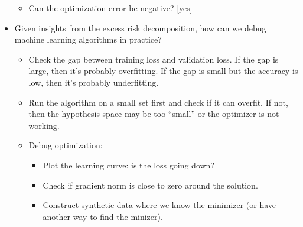 \documentclass[11pt]{article}
\begin{document}
\begin{itemize}
\begin{itemize}
\item Can the optimization error be negative? [yes]
\end{itemize}

\item Given insights from the excess risk decomposition, how can we debug machine learning algorithms in practice?
\begin{itemize}
\item Check the gap between training loss and validation loss. If the gap is large, then it's probably overfitting. If the gap is small but the accuracy is low, then it's probably underfitting.
\item Run the algorithm on a small set first and check if it can overfit. If not, then the hypothesis space may be too ``small'' or the optimizer is not working.
\item Debug optimization:
\begin{itemize}
\item Plot the learning curve: is the loss going down?
\item Check if gradient norm is close to zero around the solution.
\item Construct synthetic data where we know the minimizer (or have another way to find the minizer).
\end{itemize}
\end{itemize}

\end{itemize}
\end{document}

